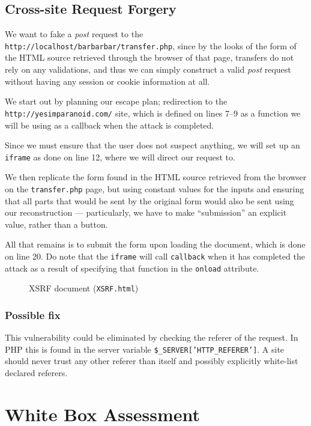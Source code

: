 \documentclass[11pt,a4paper]{article}
\newcommand{\code}[1]{{\tt #1}}
\newcommand{\file}[1]{{\tt #1}}
\begin{document}
\newpage
\subsection{Cross-site Request Forgery}
We want to fake a {\it post} request to the
{\tt http://localhost/barbarbar/transfer.php}, since by the looks of the form
of the HTML source retrieved through the browser of that page, transfers do
not rely on any validations, and thus we can simply construct a valid {\it
post} request without having any session or cookie information at all.

We start out by planning our escape plan; redirection to the {\tt
http://yesimparanoid.com/} site, which is defined on lines 7--9 as a function
we will be using as a callback when the attack is completed.

Since we must ensure that the user does not suspect anything, we will set up
an \code{iframe} as done on line 12, where we will direct our request to.

We then replicate the form found in the HTML source retrieved from the browser
on the \file{transfer.php} page, but using constant values for the inputs and
ensuring that all parts that would be sent by the original form would also be
sent using our reconstruction --- particularly, we have to make ``submission''
an explicit value, rather than a button.

All that remains is to submit the form upon loading the document, which is
done on line 20. Do note that the \code{iframe} will call \code{callback} when
it has completed the attack as a result of specifying that function in the
\code{onload} attribute.

\begin{figure}[H]
    
    \caption{XSRF document (\file{XSRF.html})}
\end{figure}

\subsubsection{Possible fix}
This vulnerability could be eliminated by checking the referer of the request.
In PHP this is found in the server variable \code{\$\_SERVER['HTTP\_REFERER']}.
A site should never trust any other referer than itself and possibly
explicitly white-list declared referers.

\newpage
\section{White Box Assessment}
\end{document}
